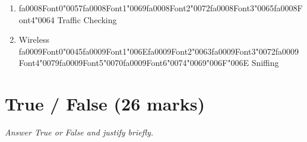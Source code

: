 \documentclass[12pt]{article}
\begin{document}
\begin{enumerate}[label=\arabic*.]
\begin{enumerate}[label=(\alph*)]
    \item {\csname fa0008Font0\endcsname\char"0057}{\csname fa0008Font1\endcsname\char"0069}{\csname fa0008Font2\endcsname\char"0072}{\csname fa0008Font3\endcsname\char"0065}{\csname fa0008Font4\endcsname\char"0064} Traffic Checking
    \item Wireless {\csname fa0009Font0\endcsname\char"0045}{\csname fa0009Font1\endcsname\char"006E}{\csname fa0009Font2\endcsname\char"0063}{\csname fa0009Font3\endcsname\char"0072}{\csname fa0009Font4\endcsname\char"0079}{\csname fa0009Font5\endcsname\char"0070}{\csname fa0009Font6\endcsname\char"0074}{\char"0069}{\char"006F}{\char"006E} Sniffing
\end{enumerate}
\end{enumerate}

\section*{True / False (26 marks)}
\textit{Answer True or False and justify briefly.}
\end{document}

